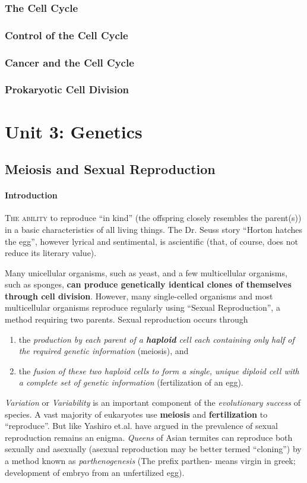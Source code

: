 \subsubsection{The Cell Cycle}
\subsubsection{Control of the Cell Cycle}
\subsubsection{Cancer and the Cell Cycle}
\subsubsection{Prokaryotic Cell Division}

\section{Unit 3: Genetics}
\subsection{Meiosis and Sexual Reproduction}
\paragraph{Introduction}
\lettrine[lines=3]{T}{he ability} to reproduce ``in kind'' (the offspring closely resembles the parent(s)) in a basic characteristics of all living things. The Dr. Seuss story ``Horton hatches the egg'', however lyrical and sentimental, is ascientific (that, of course, does not reduce its literary value).

Many unicellular organisms, such as yeast, and a few multicellular organisms, such as sponges, \textbf{can produce genetically identical clones of themselves through cell division}. However, many single-celled organisms and most multicellular organisms reproduce regularly using ``Sexual Reproduction'', a method requiring two parents. Sexual reproduction occurs through
\begin{enumerate}
    \item the \emph{production by each parent of a \textbf{haploid} cell each containing only half of the required genetic information} (meiosis), and
    \item the \emph{fusion of these two haploid cells to form a single, unique diploid cell with a complete set of genetic information} (fertilization of an egg).
\end{enumerate}
\emph{Variation} or \emph{Variability} is an important component of the \emph{evolutionary success} of species. A vast majority of eukaryotes use \textbf{meiosis} and \textbf{fertilization} to ``reproduce''. But like Yashiro et.al. have argued in \cite{yashiro-matsuura} the prevalence of sexual reproduction remains an enigma. \emph{Queens} of Asian termites can reproduce both sexually and asexually (asexual reproduction may be better termed ``cloning'') by a method known as \emph{parthenogenesis} (The prefix parthen- means virgin in greek; development of embryo from an unfertilized egg).


